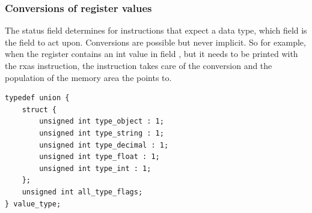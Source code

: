 \subsubsection{Conversions of register values}
The status field determines for instructions that expect a data type,
which field is the field to act upon. Conversions are possible but
never implicit. So for example, when the register contains an int
value in field , but it needs to be printed with the rxas
 instruction, the
 instruction takes care of the conversion and the population of the
memory area the  points to. 

\begin{lstlisting}[label=crexxregister,caption={Values of
the Status field}]
typedef union {
    struct {
        unsigned int type_object : 1;
        unsigned int type_string : 1;
        unsigned int type_decimal : 1;
        unsigned int type_float : 1;
        unsigned int type_int : 1;
    };
    unsigned int all_type_flags;
} value_type;
\end{lstlisting}

